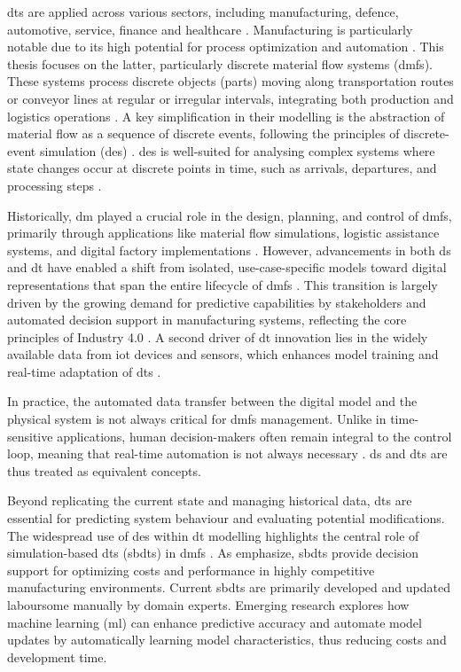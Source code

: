 \gls{dt}s are applied across various sectors, including manufacturing, defence, automotive, service, finance and healthcare \autocite{Tao2018ijamt}. Manufacturing is particularly notable due to its high potential for process optimization and automation \autocite{Tao2018ijamt}. This thesis focuses on the latter, particularly discrete material flow systems (\gls{dmfs}). These systems process discrete objects (parts) moving along transportation routes or conveyor lines at regular or irregular intervals, integrating both production and logistics operations \autocite{arnold2005materialfluss, schwede2024learning}. A key simplification in their modelling is the abstraction of material flow as a sequence of discrete events, following the principles of discrete-event simulation (\gls{des}) \autocite{kovacs2016mathematical, robinson2014simulation}. \gls{des} is well-suited for analysing complex systems where state changes occur at discrete points in time, such as arrivals, departures, and processing steps \autocite{robinson2014simulation}.

Historically, \gls{dm} played a crucial role in the design, planning, and control of \gls{dmfs}, primarily through applications like material flow simulations, logistic assistance systems, and digital factory implementations \autocite{Thiede2013}. However, advancements in both \gls{ds} and \gls{dt} have enabled a shift from isolated, use-case-specific models toward digital representations that span the entire lifecycle of \gls{dmfs} \autocite{Abdoune2023}. This transition is largely driven by the growing demand for predictive capabilities by stakeholders and automated decision support in manufacturing systems,
reflecting the core principles of Industry 4.0 \autocite{frank2019industry}. A second driver of \gls{dt} innovation lies in the widely available data from \gls{iot} devices and sensors, which enhances model training and real-time adaptation of \gls{dt}s \autocite{Tao2018ijamt}.

In practice, the automated data transfer between the digital model and the physical system is not always critical for \gls{dmfs} management. Unlike in time-sensitive applications, human decision-makers often remain integral to the control loop, meaning that real-time automation is not always necessary \autocite{schwede2024learning}. \gls{ds} and \gls{dt}s are thus treated as equivalent concepts.

Beyond replicating the current state and managing historical data, \gls{dt}s are essential for predicting system behaviour and evaluating potential modifications. The widespread use of \gls{des} within \gls{dt} modelling highlights the central role of simulation-based \gls{dt}s (\gls{sbdt}s) in \gls{dmfs} \autocite{Lugaresi2021aifac}. As \textcite{schwede2024learning} emphasize, \gls{sbdt}s provide decision support for optimizing costs and performance in highly competitive manufacturing environments. Current \gls{sbdt}s are primarily developed and updated laboursome manually by domain experts. Emerging research explores how machine learning (\gls{ml}) can enhance predictive accuracy and automate model updates by automatically learning model characteristics, thus reducing costs and development time.


